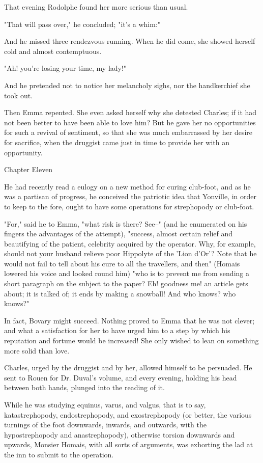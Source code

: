 \documentclass[11pt,twocolumn]{ltugboat}
\begin{document}
That evening Rodolphe found her more serious than usual.

"That will pass over," he concluded; "it's a whim:"

And he missed three rendezvous running. When he did come, she showed
herself cold and almost contemptuous.

"Ah! you're losing your time, my lady!"

And he pretended not to notice her melancholy sighs, nor the
handkerchief she took out.

Then Emma repented. She even asked herself why she detested Charles; if
it had not been better to have been able to love him? But he gave her
no opportunities for such a revival of sentiment, so that she was much
embarrassed by her desire for sacrifice, when the druggist came just in
time to provide her with an opportunity.



Chapter Eleven

He had recently read a eulogy on a new method for curing club-foot, and
as he was a partisan of progress, he conceived the patriotic idea that
Yonville, in order to keep to the fore, ought to have some operations
for strephopody or club-foot.

"For," said he to Emma, "what risk is there? See--" (and he enumerated
on his fingers the advantages of the attempt), "success, almost certain
relief and beautifying of the patient, celebrity acquired by the
operator. Why, for example, should not your husband relieve poor
Hippolyte of the 'Lion d'Or'? Note that he would not fail to tell about
his cure to all the travellers, and then" (Homais lowered his voice and
looked round him) "who is to prevent me from sending a short paragraph
on the subject to the paper? Eh! goodness me! an article gets about; it
is talked of; it ends by making a snowball! And who knows? who knows?"

In fact, Bovary might succeed. Nothing proved to Emma that he was not
clever; and what a satisfaction for her to have urged him to a step by
which his reputation and fortune would be increased! She only wished to
lean on something more solid than love.

Charles, urged by the druggist and by her, allowed himself to be
persuaded. He sent to Rouen for Dr. Duval's volume, and every evening,
holding his head between both hands, plunged into the reading of it.

While he was studying equinus, varus, and valgus, that is to say,
katastrephopody, endostrephopody, and exostrephopody (or better, the
various turnings of the foot downwards, inwards, and outwards, with the
hypostrephopody and anastrephopody), otherwise torsion downwards and
upwards, Monsier Homais, with all sorts of arguments, was exhorting the
lad at the inn to submit to the operation.
\end{document}
